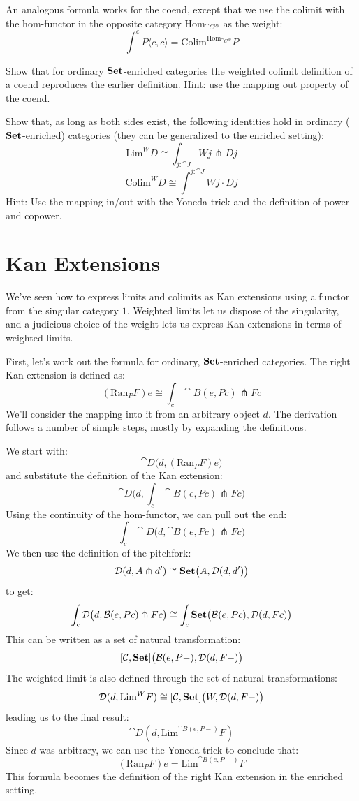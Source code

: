 \documentclass[DaoFP]{subfiles}
\begin{document}
An analogous formula works for the coend, except that we use the colimit with the hom-functor in the opposite category $\text{Hom}_{\cat C^{op}}$ as the weight:
\[  \int^c P\langle c, c\rangle = \text{Colim}^{\text{Hom}_{\cat C^{op}}} P\]

\begin{exercise}
Show that for ordinary $\mathbf{Set}$-enriched categories the weighted colimit definition of a coend reproduces the earlier definition. Hint: use the mapping out property of the coend.
\end{exercise}

\begin{exercise}
Show that, as long as both sides exist, the following identities hold in ordinary ($\mathbf{Set}$-enriched) categories (they can be generalized to the enriched setting):
\[ \text{Lim}^W D \cong \int_{j \colon \cat J} W j \pitchfork D j \]
\[ \text{Colim}^W D \cong \int^{j \colon \cat J} W j \cdot D j \]
Hint: Use the mapping in/out with the Yoneda trick and the definition of power and copower.
\end{exercise}

\section{Kan Extensions}

We've seen how to express limits and colimits as Kan extensions using a functor from the singular category $1$. Weighted limits let us dispose of the singularity, and a judicious choice of the weight lets us express Kan extensions in terms of weighted limits. 

First, let's work out the formula for ordinary, $\mathbf{Set}$-enriched categories. The right Kan extension is defined as:
 \[ (\text{Ran}_P F) e \cong \int_c \cat B (e, P c) \pitchfork F c \]
 We'll consider the mapping into it from an arbitrary object $d$. The derivation follows a number of simple steps, mostly by expanding the definitions. 
 
 We start with:
\[ \cat D\big(d, (\text{Ran}_P F) e\big) \]
 and substitute the definition of the Kan extension:
 \[ \cat D\big(d, \int_c \cat B (e, P c) \pitchfork F c\big) \]
Using the continuity of the hom-functor, we can pull out the end:
 \[ \int_c \cat D\big(d,  \cat B (e, P c) \pitchfork F c\big) \]
We then use the definition of the pitchfork:
\[ \mathcal{D} (d, A \pitchfork d') \cong \mathbf{Set}  \big(A, \mathcal{D}(d, d')\big) \]
to get:
 \[ \int_c \mathcal{D}\big(d,  \mathcal{B} (e, P c) \pitchfork F c\big) \cong \int_c \mathbf{Set}\big( \mathcal{B}(e, P c), \mathcal{D}(d, F c)\big)\]
This can be written as a set of natural transformation:
\[ [\mathcal{C}, \mathbf{Set}] \big(\mathcal{B}(e, P-), \mathcal{D}(d, F-)\big) \]
The weighted limit is also defined through the set of natural transformations:
\[  \mathcal D(d, \text{Lim}^W F) \cong [\mathcal C, \mathbf{Set}] \big(W, \mathcal D(d, F-)\big) \]
leading us to the final result:
\[ \cat D(d, \text{Lim}^{\cat B (e, P-)} F) \]
Since $d$ was arbitrary, we can use the Yoneda trick to conclude that:
\[ (\text{Ran}_P F) e = \text{Lim}^{\cat B(e, P-)} F  \]
This formula becomes the definition of the right Kan extension in the enriched setting.
\end{document}
